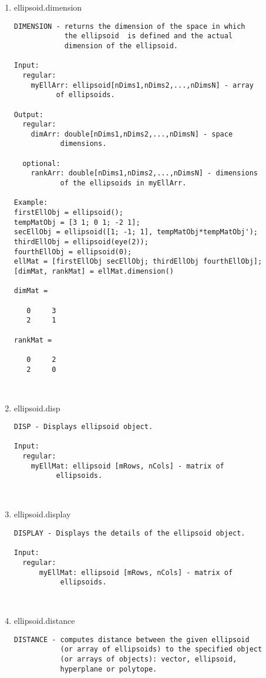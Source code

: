 \begin{enumerate}
\begin{lstlisting}
\end{lstlisting}
\fontfamily{\familydefault}
\selectfont
\item {ellipsoid.dimension}
\selectfont
\begin{lstlisting}
DIMENSION - returns the dimension of the space in which
            the ellipsoid  is defined and the actual
            dimension of the ellipsoid.

Input:
  regular:
    myEllArr: ellipsoid[nDims1,nDims2,...,nDimsN] - array
          of ellipsoids.

Output:
  regular:
    dimArr: double[nDims1,nDims2,...,nDimsN] - space
           dimensions.

  optional:
    rankArr: double[nDims1,nDims2,...,nDimsN] - dimensions
           of the ellipsoids in myEllArr.

Example:
firstEllObj = ellipsoid();
tempMatObj = [3 1; 0 1; -2 1];
secEllObj = ellipsoid([1; -1; 1], tempMatObj*tempMatObj');
thirdEllObj = ellipsoid(eye(2));
fourthEllObj = ellipsoid(0);
ellMat = [firstEllObj secEllObj; thirdEllObj fourthEllObj];
[dimMat, rankMat] = ellMat.dimension()

dimMat =

   0     3
   2     1

rankMat =

   0     2
   2     0



\end{lstlisting}
\fontfamily{\familydefault}
\selectfont
\item {ellipsoid.disp}
\selectfont
\begin{lstlisting}
DISP - Displays ellipsoid object.

Input:
  regular:
    myEllMat: ellipsoid [mRows, nCols] - matrix of
          ellipsoids.



\end{lstlisting}
\fontfamily{\familydefault}
\selectfont
\item {ellipsoid.display}
\selectfont
\begin{lstlisting}
DISPLAY - Displays the details of the ellipsoid object.

Input:
  regular:
      myEllMat: ellipsoid [mRows, nCols] - matrix of
           ellipsoids.



\end{lstlisting}
\fontfamily{\familydefault}
\selectfont
\item {ellipsoid.distance}
\selectfont
\begin{lstlisting}
DISTANCE - computes distance between the given ellipsoid
           (or array of ellipsoids) to the specified object
           (or arrays of objects): vector, ellipsoid,
           hyperplane or polytope.


\end{lstlisting}
\end{enumerate}
